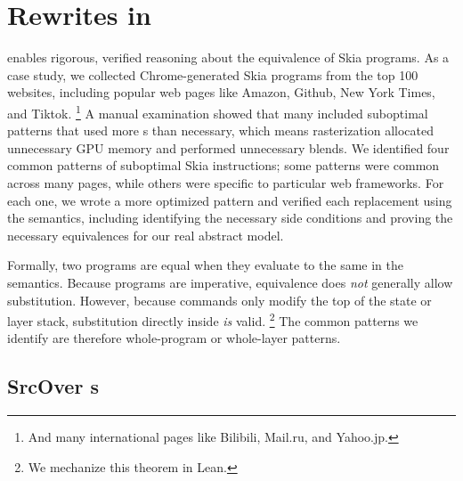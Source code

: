 \documentclass[main.tex]{subfiles}
\begin{document}
\section{\texorpdfstring{Rewrites in \muskia}{Rewrites in muSkia}}
\label{sec:rewrites}

\muskia enables rigorous, verified reasoning
  about the equivalence of Skia programs.
As a case study,
  we collected Chrome-generated Skia programs
  from the top 100 websites, including popular web pages like
  Amazon, Github, New York Times, and Tiktok.%
\footnote{
And many international pages like Bilibili, Mail.ru, and Yahoo.jp.
}
A manual examination showed that many included
  suboptimal patterns that used more \SaveLayer{}s than necessary,
  which means rasterization allocated unnecessary GPU memory
  and performed unnecessary blends.
We identified four common patterns of suboptimal Skia instructions;
  some patterns were common across many pages,
  while others were specific to particular web frameworks.
For each one, we wrote a more optimized pattern
  and verified each replacement using the \muskia semantics,
  including identifying the necessary side conditions
  and proving the necessary equivalences for our real abstract model.

Formally, two \muskia programs are equal
  when they evaluate to the same \Image in the \muskia semantics.
Because \muskia programs are imperative,
  equivalence does \emph{not} generally allow substitution.
However, because \muskia commands
  only modify the top of the state or layer stack,
  substitution directly inside \SaveLayer \emph{is} valid.%
\footnote{
We mechanize this theorem in Lean.
}
The common patterns we identify
  are therefore whole-program or whole-layer patterns.

\subsection{SrcOver \SaveLayer{}s}
\label{subsec:src-over-layer}
\end{document}
